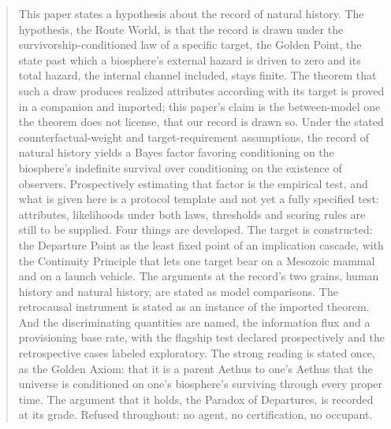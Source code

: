 \begin{abstract}
This paper states a hypothesis about the record of natural history. The hypothesis, the Route World, is that the record is drawn under the survivorship-conditioned law of a specific target, the Golden Point, the state past which a biosphere's external hazard is driven to zero and its total hazard, the internal channel included, stays finite. The theorem that such a draw produces realized attributes according with its target is proved in a companion and imported; this paper's claim is the between-model one the theorem does not license, that our record is drawn so. Under the stated counterfactual-weight and target-requirement assumptions, the record of natural history yields a Bayes factor favoring conditioning on the biosphere's indefinite survival over conditioning on the existence of observers. Prospectively estimating that factor is the empirical test, and what is given here is a protocol template and not yet a fully specified test: attributes, likelihoods under both laws, thresholds and scoring rules are still to be supplied. Four things are developed. The target is constructed: the Departure Point as the least fixed point of an implication cascade, with the Continuity Principle that lets one target bear on a Mesozoic mammal and on a launch vehicle. The arguments at the record's two grains, human history and natural history, are stated as model comparisons. The retrocausal instrument is stated as an instance of the imported theorem. And the discriminating quantities are named, the information flux and a provisioning base rate, with the flagship test declared prospectively and the retrospective cases labeled exploratory. The strong reading is stated once, as the Golden Axiom: that it is a parent Aethus to one's Aethus that the universe is conditioned on one's biosphere's surviving through every proper time. The argument that it holds, the Paradox of Departures, is recorded at its grade. Refused throughout: no agent, no certification, no occupant.

\end{abstract}
